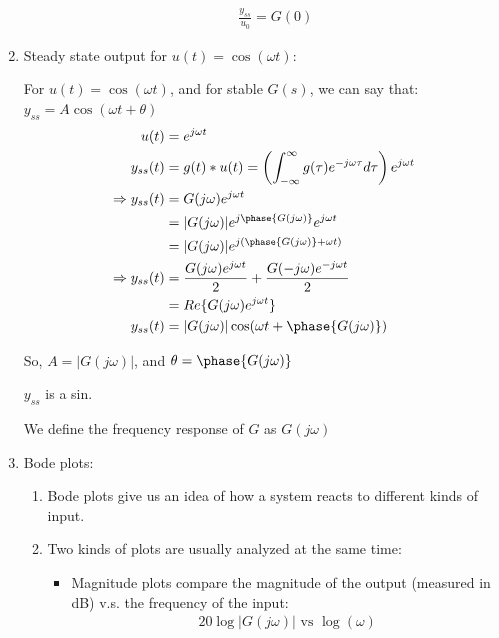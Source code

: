 \begin{enumerate}
\begin{enumerate}
                \begin{align*} \frac{y_{ss}}{u_0} = G(0) \end{align*}

        \end{enumerate}
    \item Steady state output for $u(t) = \cos(\omega t)$:

        For $u(t) = \cos(\omega t)$, and for stable $G(s)$, we can say that: $y_{ss} = A \cos(\omega t + \theta)$
            \begin{align*}
                u(t) &= e^{j\omega t} \\
                y_{ss}(t) &= g(t) * u(t) = \left( \int_{-\infty}^{\infty} g(\tau) e^{-j\omega \tau} d\tau \right) e^{j \omega t} \\
                \Rightarrow y_{ss}(t) &= G(j\omega)e^{j \omega t} \\
                &= |G(j\omega)|e^{j\phase{G(j\omega)}} e^{j \omega t} \\
                &= |G(j\omega)|e^{j  \left(\phase{G(j\omega)} + \omega t \right) } \\
                \Rightarrow y_{ss}(t) &= \frac{G(j\omega)e^{j  \omega t }}{2} + \frac{G(-j\omega)e^{-j  \omega t }}{2} \\
                &= Re\{ G(j\omega) e^{j  \omega t } \} \\
                y_{ss}(t) &= | G(j\omega) | \cos({\omega t + \phase{G(j \omega)}}) \\
            \end{align*}

        So, $A = |G(j \omega) |$, and $\theta = \phase{G(j \omega)}$

        $y_{ss}$ is a sin.

        We define the frequency response of $G$ as $G(j \omega)$
    \item Bode plots:

        \begin{enumerate}
            \item Bode plots give us an idea of how a system reacts to different kinds of input.

            \item Two kinds of plots are usually analyzed at the same time:

                \begin{itemize}
                    \item Magnitude plots compare the magnitude of the output (measured in dB) v.s. the frequency of the input:
                        \begin{align*} 20 \log{|G(j\omega)|} \text{ vs } \log(\omega) \end{align*}


\end{itemize}
\end{enumerate}
\end{enumerate}
